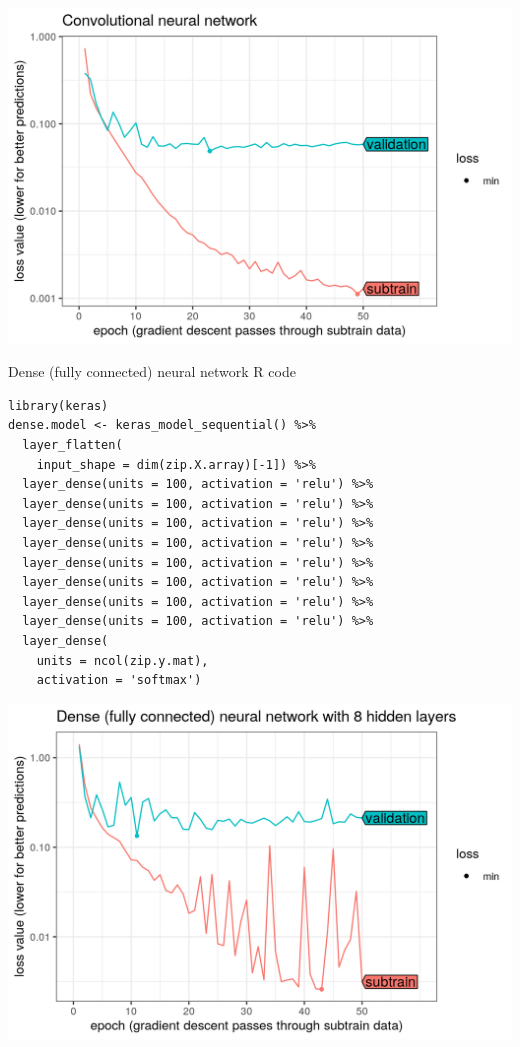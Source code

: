 \documentclass{article}
\begin{document}
  \includegraphics[width=\textwidth]{figure-validation-loss-conv}

{Dense (fully connected) neural network R code}
\begin{verbatim}
library(keras)
dense.model <- keras_model_sequential() %>%
  layer_flatten(
    input_shape = dim(zip.X.array)[-1]) %>%
  layer_dense(units = 100, activation = 'relu') %>% 
  layer_dense(units = 100, activation = 'relu') %>% 
  layer_dense(units = 100, activation = 'relu') %>% 
  layer_dense(units = 100, activation = 'relu') %>%
  layer_dense(units = 100, activation = 'relu') %>%
  layer_dense(units = 100, activation = 'relu') %>% 
  layer_dense(units = 100, activation = 'relu') %>%   
  layer_dense(units = 100, activation = 'relu') %>% 
  layer_dense(
    units = ncol(zip.y.mat), 
    activation = 'softmax')
\end{verbatim}

\includegraphics[width=\textwidth]{figure-validation-loss-dense}
\end{document}
